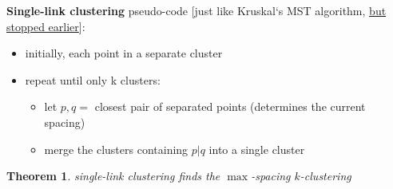 \documentclass[a4paper,12pt]{article}
\theoremstyle{plain}
\newtheorem*{theorem}{Theorem}
\theoremstyle{definition}
\theoremstyle{remark}
\begin{document}
\textbf{Single-link clustering} pseudo-code [just like Kruskal`s MST algorithm, \underline{but stopped earlier}]:
\begin{itemize}
\item initially, each point in a separate cluster
\item repeat until only k clusters:
	\begin{itemize}
		\item let $p, q =$ closest pair of separated points (determines the current spacing)
		\item merge the clusters containing $p|q$ into a single cluster
	\end{itemize}
\end{itemize}

\begin{theorem}single-link clustering finds the $\max$-spacing $k$-clustering\end{theorem}
\end{document}
